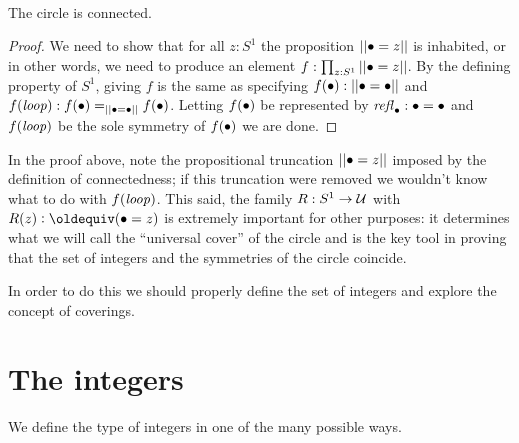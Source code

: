 \
\begin{lemma}\label{lem:circleisconnected}
  The circle is connected.
\end{lemma}
\begin{proof}
  We need to show that for all $z:S^1$ the proposition $||\bullet=z||$ is inhabited, or in other words, we need to produce an element  $f:\prod_{z:S^1}||\bullet=z||$.    By the defining property of $S^1$, giving $f$ is the same as specifying $f(\bullet):||\bullet=\bullet||$ and $f(\mathit{loop}):f(\bullet)=_{||\bullet=\bullet||}f(\bullet)$.  Letting $f(\bullet)$ be represented by $\mathop{{\it refl}_{\bullet}}:\bullet=\bullet$ and $f(\mathit{loop})$ be the sole symmetry of $f(\bullet)$ we are done.
\end{proof}
In the proof above, note the propositional truncation $||\bullet=z||$ imposed by the definition of connectedness; if this truncation were removed we wouldn't know what to do with $f(\mathit{loop})$.  This said, the family $R:S^1\to\mathcal{U}$ with $R(z)\defequi (\base=z)$ is extremely important for other purposes: it determines what we will call the ``universal cover'' of the circle and is the key tool in proving that the set of integers and the symmetries of the circle coincide.

In order to do this we should properly define the set of integers and explore the concept of coverings.


\section{The integers}
\label{sec:integers}

We define the type of integers in one of the many possible ways.

